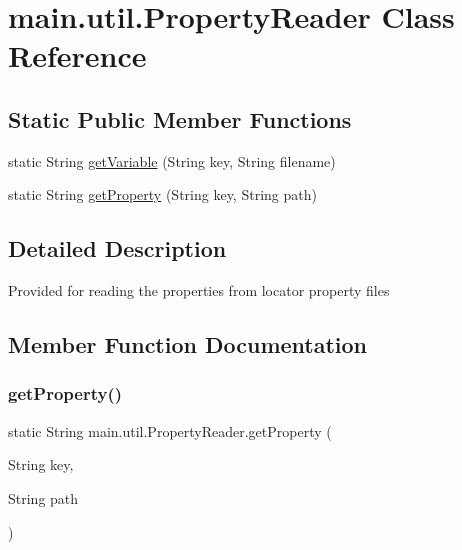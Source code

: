 \hypertarget{classmain_1_1util_1_1_property_reader}{}\section{main.\+util.\+Property\+Reader Class Reference}
\label{classmain_1_1util_1_1_property_reader}
\subsection*{Static Public Member Functions}
\begin{DoxyCompactItemize}
\item 
static String \mbox{\hyperlink{classmain_1_1util_1_1_property_reader_afe8518f6cdcdef0822dcf94d236eae6c}{get\+Variable}} (String key, String filename)
\item 
static String \mbox{\hyperlink{classmain_1_1util_1_1_property_reader_adc3245cf512536665c277f0a0560497d}{get\+Property}} (String key, String path)
\end{DoxyCompactItemize}


\subsection{Detailed Description}
Provided for reading the properties from locator property files 

\subsection{Member Function Documentation}
\mbox{\label{classmain_1_1util_1_1_property_reader_adc3245cf512536665c277f0a0560497d}} 
\subsubsection{\texorpdfstring{get\+Property()}{getProperty()}}
{\footnotesize\ttfamily static String main.\+util.\+Property\+Reader.\+get\+Property (\begin{DoxyParamCaption}\item[{String}]{key,  }\item[{String}]{path }\end{DoxyParamCaption})\hspace{0.3cm}{\ttfamily [static]}}

